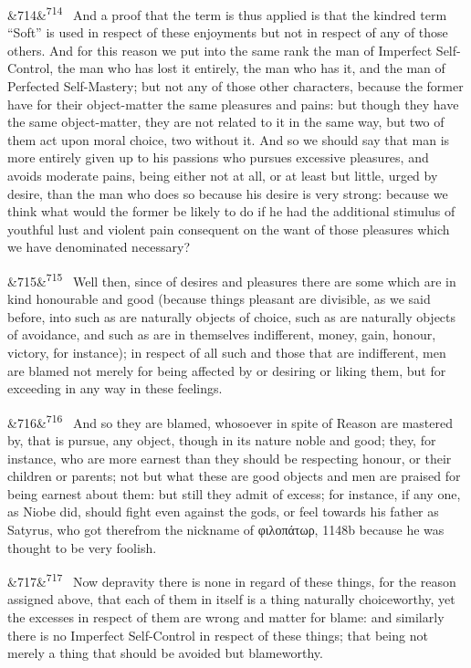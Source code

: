 \documentclass[12pt]{article}
\newcommand{\para}[1][]{\par\noindent\ifx&#1&\else\textsuperscript{\footnotesize #1}~\fi}
\begin{document}
\para[714] And a proof that the term is thus applied is that the kindred term “Soft” is used in respect of these enjoyments but not in respect of any of those others. And for this reason we put into the same rank the man of Imperfect Self-Control, the man who has lost it entirely, the man who has it, and the man of Perfected Self-Mastery; but not any of those other characters, because the former have for their object-matter the same pleasures and pains: but though they have the same object-matter, they are not related to it in the same way, but two of them act upon moral choice, two without it. And so we should say that man is more entirely given up to his passions who pursues excessive pleasures, and avoids moderate pains, being either not at all, or at least but little, urged by desire, than the man who does so because his desire is very strong: because we think what would the former be likely to do if he had the additional stimulus of youthful lust and violent pain consequent on the want of those pleasures which we have denominated necessary?

\para[715] Well then, since of desires and pleasures there are some which are in kind honourable and good (because things pleasant are divisible, as we said before, into such as are naturally objects of choice, such as are naturally objects of avoidance, and such as are in themselves indifferent, money, gain, honour, victory, for instance); in respect of all such and those that are indifferent, men are blamed not merely for being affected by or desiring or liking them, but for exceeding in any way in these feelings.

\para[716] And so they are blamed, whosoever in spite of Reason are mastered by, that is pursue, any object, though in its nature noble and good; they, for instance, who are more earnest than they should be respecting honour, or their children or parents; not but what these are good objects and men are praised for being earnest about them: but still they admit of excess; for instance, if any one, as Niobe did, should fight even against the gods, or feel towards his father as Satyrus, who got therefrom the nickname of φιλοπάτωρ, 1148b because he was thought to be very foolish.

\para[717] Now depravity there is none in regard of these things, for the reason assigned above, that each of them in itself is a thing naturally choiceworthy, yet the excesses in respect of them are wrong and matter for blame: and similarly there is no Imperfect Self-Control in respect of these things; that being not merely a thing that should be avoided but blameworthy.
\end{document}
